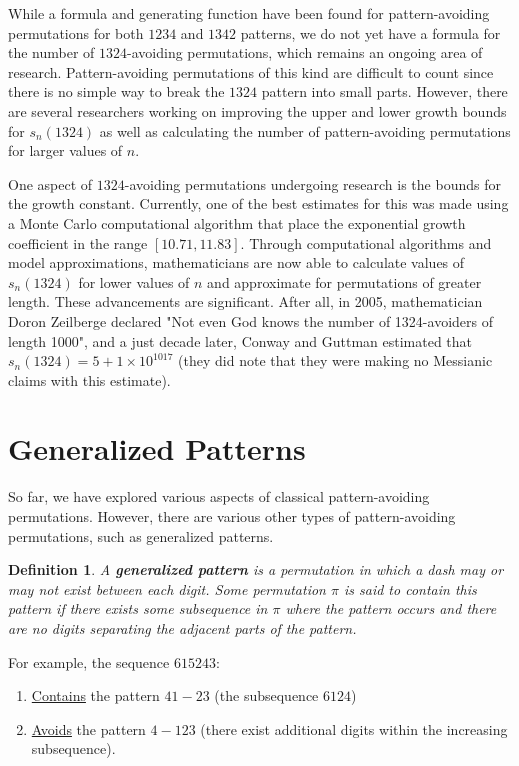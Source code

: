 \documentclass[12pt]{article}
\newtheorem{defn}{Definition} %
\begin{document}
While a formula and generating function have been found for pattern-avoiding permutations for both $1234$ and $1342$ patterns, we do not yet have a formula for the number of $1324$-avoiding permutations, which remains an ongoing area of research. Pattern-avoiding permutations of this kind are difficult to count since there is no simple way to break the $1324$ pattern into small parts. However, there are several researchers working on improving the upper and lower growth bounds for $s_n(1324)$ as well as calculating the number of pattern-avoiding permutations for larger values of $n$.


One aspect of $1324$-avoiding permutations undergoing research is the bounds for the growth constant. Currently, one of the best estimates for this was made using a Monte Carlo computational algorithm that place the exponential growth coefficient in the range $[10.71,11.83]$.\cite{Conway&Guttman2015} Through computational algorithms and model approximations, mathematicians are now able to calculate values of $s_n(1324)$ for lower values of $n$ and approximate for permutations of greater length. These advancements are significant. After all, in 2005, mathematician Doron Zeilberge declared "Not even God knows the number of 1324-avoiders of length 1000", and a just decade later, Conway and Guttman estimated that $s_n(1324) = 5+1 \times 10^{1017}$ (they did note that they were making no Messianic claims with this estimate).\cite{Conway&Guttman2015}



\section{Generalized Patterns}
So far, we have explored various aspects of classical pattern-avoiding permutations. However, there are various other types of pattern-avoiding permutations, such as generalized patterns.

\begin{defn}
A {\bf generalized pattern} is a permutation in which a dash may or may not exist between each digit. Some permutation $\pi$ is said to contain this pattern if there exists some subsequence in $\pi$ where the pattern occurs and there are no digits separating the adjacent parts of the pattern.
\end{defn}

For example, the sequence $615243$:

\begin{enumerate}
\item \underline{Contains} the pattern $41-23$ (the subsequence $6124$)

\item \underline{Avoids} the pattern $4-123$ (there exist additional digits within the increasing subsequence).

\end{enumerate}
\end{document}
